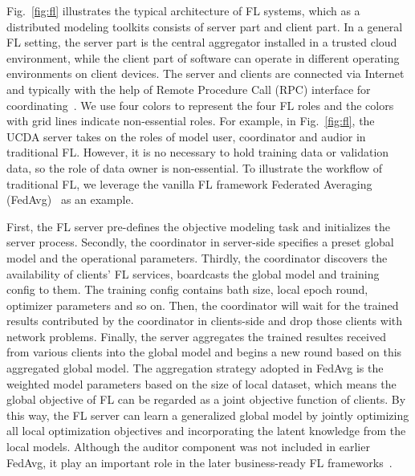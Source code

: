 Fig.~\ref{fig:fl} illustrates the typical architecture of FL systems, which as a distributed modeling toolkits consists of server part and client part. 
In a general FL setting, the server part is the central aggregator installed in a trusted cloud environment, while the client part of software can operate in different operating environments on client devices. 
The server and clients are connected via Internet and typically with the help of Remote Procedure Call (RPC) interface for coordinating~\cite{zhang2022felicitas, abadi2016tensorflow, liu2021fate, beutel2020flower, he2020fedml}.
We use four colors to represent the four FL roles and the colors with grid lines indicate non-essential roles.
For example, in Fig.~\ref{fig:fl}, the UCDA server takes on the roles of model user, coordinator and audior in traditional FL. 
However, it is no necessary to hold training data or validation data, so the role of data owner is non-essential.
To illustrate the workflow of traditional FL, we leverage the vanilla FL framework Federated Averaging (FedAvg)~\cite{mcmahan2017communication, bonawitz2019towards} as an example.

First, the FL server pre-defines the objective modeling task and initializes the server process.
Secondly,  the coordinator in server-side specifies a preset global model and the operational parameters.
Thirdly, the coordinator discovers the availability of clients' FL services, boardcasts the global model and training config to them. The training config contains bath size, local epoch round, optimizer parameters and so on. Then, the coordinator will wait for the trained results contributed by the coordinator in clients-side and drop those clients with network problems.
Finally, the server aggregates the trained resultes received from various clients into the global model and begins a new round based on this aggregated global model. 
The aggregation strategy adopted in FedAvg is the weighted model parameters based on the size of local dataset, which means the global objective of FL can be regarded as a joint objective function of clients. 
By this way, the FL server can learn a generalized global model by jointly optimizing all local optimization objectives and incorporating the latent knowledge from the local models.
Although the auditor component was not included in earlier FedAvg, it play an important role in the later business-ready FL frameworks~\cite{liu2021fate,roth2022nvidia, ziller2021pysyft}.

